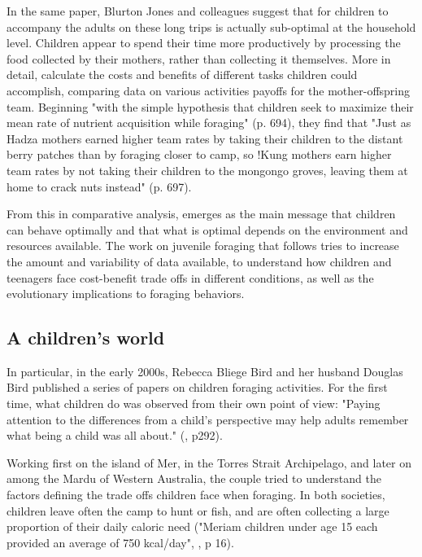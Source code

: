 In the same paper, Blurton Jones and colleagues suggest that for children to accompany the adults on these long trips is actually sub-optimal at the household level. Children appear to spend their time more productively by processing the food collected by their mothers, rather than collecting it themselves. More in detail, \cite{hawkes_hadza_1995} calculate the costs and benefits of different tasks children could accomplish, comparing data on various activities payoffs for the mother-offspring team. Beginning "with the simple hypothesis that children seek to maximize their mean rate of nutrient acquisition while foraging" (p. 694), they find that "Just as Hadza mothers earned higher team rates by taking their children to the distant berry patches than by foraging closer to camp, so !Kung mothers earn higher team rates by not taking their children to the mongongo groves, leaving them at home to crack nuts instead" (p. 697).

From this in comparative analysis, emerges as the main message that children can behave optimally and that what is optimal depends on the environment and resources available. The work on juvenile foraging that follows tries to increase the amount and variability of data available, to understand how children and teenagers face cost-benefit trade offs in different conditions, as well as the evolutionary implications to foraging behaviors.

\subsection{A children's world}

In particular, in the early 2000s, Rebecca Bliege Bird and her husband Douglas Bird published a series of papers on children foraging activities. For the first time, what children do was observed from their own point of view: "Paying attention to the differences from a child's perspective may help adults remember what being a child was all about." (\cite{bird_children_2002}, p292).

Working first on the island of Mer, in the Torres Strait Archipelago, and later on among the Mardu of Western Australia, the couple tried to understand the factors defining the trade offs children face when foraging. In both societies, children leave often the camp to hunt or fish, and are often collecting a large proportion of their daily caloric need ("Meriam children under age 15 each provided an average of 750 kcal/day", \cite{bliege_bird_children_1995}, p 16).

